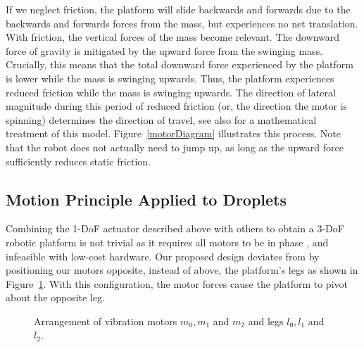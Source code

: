 \documentclass[letterpaper, 10pt, conference]{ieeeconf}
\begin{document}
If we neglect friction, the platform will slide backwards and forwards due to the backwards and forwards forces from the mass, but experiences no net translation. With friction, the vertical forces of the mass become relevant. The downward force of gravity is mitigated by the upward force from the swinging mass. Crucially, this means that the total downward force experienced by the platform is lower while the mass is swinging upwards. Thus, the platform experiences reduced friction while the mass is swinging upwards. The direction of lateral magnitude during this period of reduced friction (or, the direction the motor is spinning) determines the direction of travel, see also \cite{Vartholomeos2005,Vartholomeos2006} for a mathematical treatment of this model. Figure~\ref{motorDiagram} illustrates this process. Note that the robot does not actually need to jump up, as long as the upward force sufficiently reduces static friction. 


\subsection{Motion Principle Applied to Droplets}
Combining the 1-DoF actuator described above with others to obtain a 3-DoF robotic platform is not trivial as it requires all motors to be in phase \cite{Vartholomeos2005}, and infeasible with low-cost hardware. Our proposed design deviates from \cite{Vartholomeos2005} by positioning our motors opposite, instead of above, the platform's legs as shown in Figure~\ref{DropletMotorDiagram}. With this configuration, the motor forces cause the platform to pivot about the opposite leg.


\begin{figure}[!htb]
\centering

\caption{Arrangement of vibration motors $m_0, m_1$ and $m_2$ and legs $l_0, l_1$ and $l_2$.}
\label{DropletMotorDiagram}
\end{figure}
\end{document}
